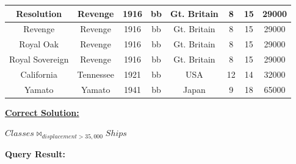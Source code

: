 \documentclass[12pt]{article}
\begin{document}
\begin{enumerate}
\begin{enumerate}[a)]
{\begin{tabular}{|c|c|c|c|c|c|c|c|}
            \hline
            Resolution  &   Revenge    &   1916    &   bb  &   Gt. Britain   &   8   &   15  &   29000\\
            \hline
            Revenge  &   Revenge    &   1916    &   bb  &   Gt. Britain   &   8   &   15  &   29000\\
            \hline
            Royal Oak  &   Revenge    &   1916    &   bb  &   Gt. Britain   &   8   &   15  &   29000\\
            \hline
            Royal Sovereign  &   Revenge    &   1916    &   bb  &   Gt. Britain   &   8   &   15  &   29000\\
            \hline
            California  &   Tennessee    &   1921    &   bb  &   USA   &   12   &   14  &   32000\\
            \hline
            Yamato  &   Yamato    &   1941    &   bb  &   Japan   &   9   &   18  &   65000\\
            \hline
        \end{tabular}}


        \bigskip

        \begin{mdframed}
            \underline{\textbf{Correct Solution:}}

            \bigskip

            $Classes \bowtie_{displacement > 35,000} Ships$

            \bigskip

            \textbf{Query Result:}

            \bigskip


\end{mdframed}
\end{enumerate}
\end{enumerate}
\end{document}
